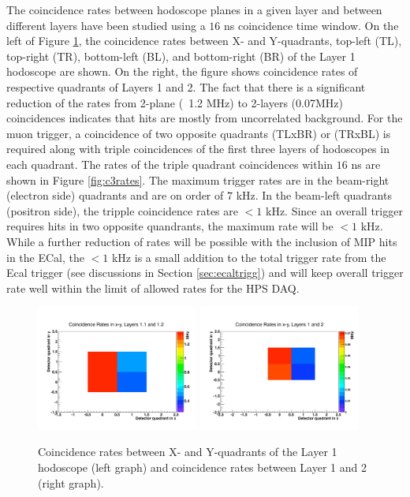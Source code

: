 The coincidence rates between hodoscope planes in a given layer and between different layers have been studied using a $16$ ns coincidence 
time window. 
On the left of  Figure \ref{fig:c1rates}, the coincidence rates between X- and Y-quadrants, top-left (TL), top-right (TR), bottom-left 
(BL), and bottom-right (BR) of the Layer 1 hodoscope are shown. On the right, the figure shows coincidence rates of respective 
quadrants of Layers 1 and 2. The fact that there is a significant reduction of the rates from 2-plane (~1.2 MHz) to 2-layers (0.07MHz) 
coincidences indicates that hits are mostly from uncorrelated background. For the muon trigger, a coincidence of two opposite quadrants 
(TLxBR) or (TRxBL) is required along with triple coincidences of the first three layers of hodoscopes in each quadrant. The rates of the 
triple quadrant  
coincidences within $16$ ns are shown in Figure \ref{fig:c3rates}. The maximum trigger rates are in the beam-right (electron side) 
quadrants and are on order of $7$ kHz. In the beam-left quadrants (positron side), the tripple coincidence rates are $<1$ kHz. 
Since an overall trigger requires hits in two opposite quandrants, the maximum 
rate will be $<1$ kHz. While a further reduction of rates will be possible with the inclusion of 
MIP hits in the ECal, the $<1$ kHz is a small addition to the total trigger rate from the Ecal trigger (see discussions in 
Section \ref{sec:ecaltrigg}) and will keep overall trigger rate well within the limit of allowed rates for the HPS DAQ.   

\begin{figure}[htbp]
\begin{center}
\includegraphics[width=0.475\textwidth]{performance/trigger/muon_coinrate1}
\includegraphics[width=0.475\textwidth]{performance/trigger/muon_coinrate2}
\caption{Coincidence rates between X- and Y-quadrants of the Layer 1 hodoscope (left graph) and coincidence rates between Layer 1 and 2 
(right graph). }
\label{fig:c1rates}
\end{center}
\end{figure}


